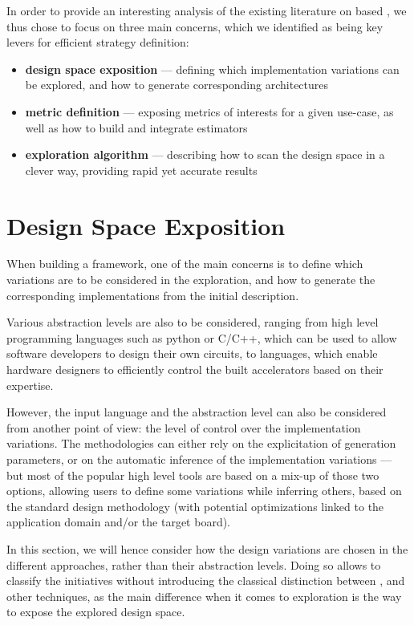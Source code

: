 In order to provide an interesting analysis of the existing literature on  based , we thus chose to focus on three main concerns, which we identified as being key levers for efficient strategy definition: 
{
\begin{itemize}
    \item {\bf design space exposition} --- \ie defining which implementation variations can be explored, and how to generate corresponding architectures
    \item {\bf metric definition} --- \ie exposing metrics of interests for a given use-case, as well as how to build and integrate estimators
    \item {\bf exploration algorithm} --- \ie describing how to scan the design space in a clever way, providing rapid yet accurate results
\end{itemize}
}

\clearpage
\section{Design Space Exposition}
\label{ch.state:sec.space}
    When building a  framework, one of the main concerns is to define which variations are to be considered in the exploration, and how to generate the corresponding implementations from the initial description.

    Various abstraction levels are also to be considered, ranging from high level programming languages such as python or C/C++, which can be used to allow software developers to design their own circuits, to  languages, which enable hardware designers to efficiently control the built accelerators based on their expertise.

    However, the input language and the abstraction level can also be considered from another point of view: the level of control over the implementation variations.
    The  methodologies can either rely on the explicitation of generation parameters, or on the automatic inference of the implementation variations --- but most of the popular high level tools are based on a mix-up of those two options, allowing users to define some variations while inferring others, based on the standard design methodology (with potential optimizations linked to the application domain and/or the target board).

    In this section, we will hence consider how the design variations are chosen in the different approaches, rather than their abstraction levels.
    Doing so allows to classify the  initiatives without introducing the classical distinction between ,  and other techniques, as the main difference when it comes to exploration is the way to expose the explored design space.

